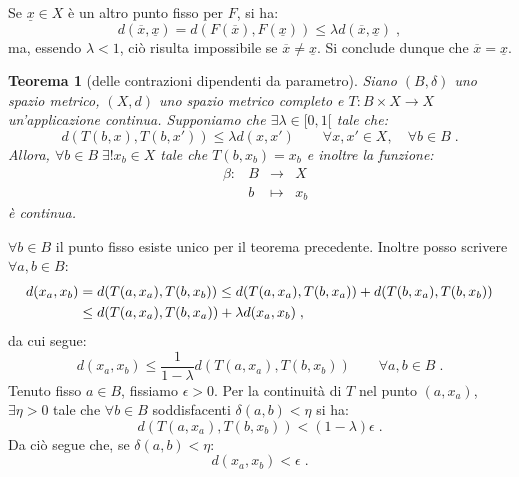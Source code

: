 \documentclass[a4paper,12pt]{report}
\theoremstyle{plain}
\newtheorem{thm}{Teorema}[section]
\theoremstyle{definition}
\theoremstyle{remark}
\numberwithin{equation}{section}
\begin{document}
Se $\underline{x}\in X$ è un altro punto fisso per $F$, si ha:
\begin{equation}
d(\overline{x},\underline{x})=d(F(\overline{x}),F(\underline{x})) \le \lambda d(\overline{x},\underline{x})\;,
\end{equation}
ma, essendo $\lambda<1$, ciò risulta impossibile se $\overline{x}\ne\underline{x}$. Si conclude dunque che $\overline{x}=\underline{x}$.
\endproof
\begin{thm}[delle contrazioni dipendenti da parametro] Siano $(B,\delta)$ uno spazio metrico, $(X,d)$ uno spazio metrico completo e $T:B\times X \to X$ un'applicazione continua. Supponiamo che $\exists \lambda \in [0,1[$ tale che:
\begin{equation}
d(T(b,x),T(b,x')) \le \lambda d(x,x') \qquad \forall x,x' \in X, \quad \forall b \in B\;.
\end{equation}
Allora, $\forall b \in B\; \exists! x_b \in X$ tale che $T(b,x_b)=x_b$ e inoltre la funzione:
\begin{equation}
\begin{matrix}
&\beta: & B & \to &X \\
&{} &b &\mapsto & x_b
\end{matrix}
\end{equation}
è continua.
\end{thm}
\proof $\forall b \in B$ il punto fisso esiste unico per il teorema precedente. Inoltre posso scrivere $\forall a,b \in B$:
\begin{align}
d(x_a,x_b) &= d(T(a,x_a),T(b,x_b)) \le d(T(a,x_a),T(b,x_a))+d(T(b,x_a),T(b,x_b)) \notag \\
&\le d(T(a,x_a),T(b,x_a))+\lambda d(x_a,x_b)\;,
\end{align}
da cui segue:
\begin{equation}
d(x_a,x_b) \le \frac{1}{1-\lambda} d(T(a,x_a),T(b,x_b)) \qquad \forall a,b \in B\;.
\end{equation}
Tenuto fisso $a \in B$, fissiamo $\epsilon>0$. Per la continuità di $T$ nel punto $(a,x_a)$, $\exists \eta>0$ tale che $\forall b \in B$ 
soddisfacenti $\delta(a,b)<\eta$ si ha:
\begin{equation}
d(T(a,x_a),T(b,x_b))<(1-\lambda)\epsilon\;.
\end{equation}
Da ciò segue che, se $\delta(a,b)<\eta$:
\begin{equation}
d(x_a,x_b)< \epsilon\;.
\end{equation}
\endproof
\end{document}
